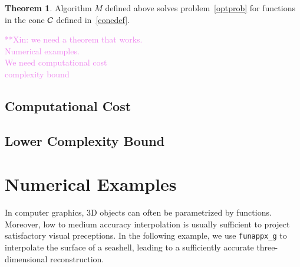 \documentclass[review]{elsarticle}
\theoremstyle{definition}
\newcommand{\xinnote}[1]{ {\textcolor{violet}  {\mbox{**Xin:} #1}}}
\newtheorem{theorem}{Theorem}
\newcommand{\funappxg}{\texttt{funappx\_g\xspace}}
\begin{document}
\begin{theorem} \label{thm:algMworks}
Algorithm $M$ defined above solves problem~\eqref{optprob} for functions in the cone $\mathcal{C}$ defined in~\eqref{conedef}.
\end{theorem}
\xinnote{
we need a theorem that works.\\
Numerical examples.\\
We need computational cost\\
complexity bound
}

\subsection{Computational Cost} \label{subsec:optcost}

\subsection{Lower Complexity Bound} \label{subsec:optcomp}



\section{Numerical Examples}


In computer graphics, 3D objects can often be parametrized by functions.
Moreover, low to medium accuracy interpolation is usually sufficient to project
satisfactory visual preceptions. In the following example, we use \funappxg{} to
interpolate the surface of a seashell, leading to a sufficiently accurate
three-dimensional reconstruction.
\end{document}
